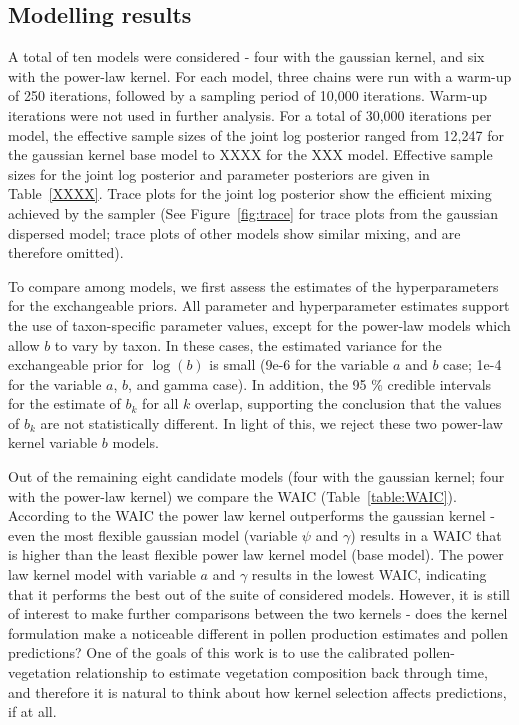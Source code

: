 \documentclass[12pt]{article}
\begin{document}
\subsection{Modelling results}

A total of ten models were considered - four with the gaussian kernel,
and six with the power-law kernel. For each model, three chains were
run with a warm-up of 250 iterations, followed by a sampling period of
10,000 iterations. Warm-up iterations were not used in further
analysis. For a total of 30,000 iterations per model, the effective
sample sizes of the joint log posterior ranged from 12,247 for the
gaussian kernel base model to XXXX for the XXX model. Effective sample
sizes for the joint log posterior and parameter posteriors are given
in Table~\ref{XXXX}. Trace plots for the joint log posterior show the
efficient mixing achieved by the sampler (See Figure~\ref{fig:trace}
for trace plots from the gaussian dispersed model; trace plots of
other models show similar mixing, and are therefore omitted).

To compare among models, we first assess the estimates of the
hyperparameters for the exchangeable priors. All parameter and
hyperparameter estimates support the use of taxon-specific parameter
values, except for the power-law models which allow $b$ to vary by
taxon. In these cases, the estimated variance for the exchangeable
prior for $\log ( b )$ is small (9e-6 for the variable $a$ and $b$ case;
1e-4 for the variable $a$, $b$, and gamma case). In addition, the 95 \%
credible intervals for the estimate of $b_k$ for all $k$ overlap,
supporting the conclusion that the values of $b_k$ are not
statistically different. In light of this, we reject these two
power-law kernel variable $b$ models. 

Out of the remaining eight candidate models (four with the gaussian
kernel; four with the power-law kernel) we compare the WAIC
(Table~\ref{table:WAIC}). According to the WAIC the power law kernel
outperforms the gaussian kernel - even the most flexible gaussian
model (variable $\psi$ and $\gamma$) results in a WAIC that is higher
than the least flexible power law kernel model (base model). The power
law kernel model with variable $a$ and $\gamma$ results in the lowest
WAIC, indicating that it performs the best out of the suite of
considered models. However, it is still of interest to make further
comparisons between the two kernels - does the kernel formulation make
a noticeable different in pollen production estimates and pollen
predictions? One of the goals of this work is to use the calibrated
pollen-vegetation relationship to estimate vegetation composition back
through time, and therefore it is natural to think about how kernel
selection affects predictions, if at all.
\end{document}
